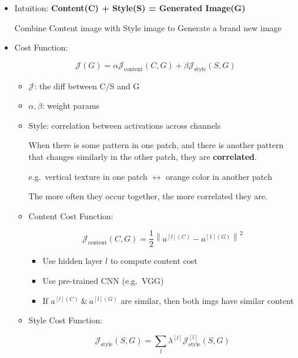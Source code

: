 \documentclass[
]{book}
\providecommand{\tightlist}{%
  \setlength{\itemsep}{0pt}\setlength{\parskip}{0pt}}
\begin{document}
\begin{itemize}
  \begin{itemize}
  \item
    Intuition: \textbf{Content(C) + Style(S) = Generated Image(G)}

    Combine Content image with Style image to Generate a brand new image
  \item
    Cost Function:

    \[\begin{equation}
      \mathcal{J}(G)=\alpha\mathcal{J}_ \text{content}(C,G)+\beta\mathcal{J}_ \text{style}(S,G)
      \end{equation}\]

    \begin{itemize}
    \item
      \(\mathcal{J}\): the diff between C/S and G
    \item
      \(\alpha,\beta\): weight params
    \item
      Style: correlation between activations across channels

      When there is some pattern in one patch, and there is another
      pattern that changes similarly in the other patch, they are
      \textbf{correlated}.

      e.g.~vertical texture in one patch \(\leftrightarrow\) orange
      color in another patch

      The more often they occur together, the more correlated they are.
    \item
      Content Cost Function:

      \[\begin{equation}
        \mathcal{J}_ \text{content}(C,G)=\frac{1}{2}\left\lVert{a^{[l](C)}-a^{[1](G)}}\right\lVert^2
        \end{equation}\]

      \begin{itemize}
      \tightlist
      \item
        Use hidden layer \(l\) to compute content cost
      \item
        Use pre-trained CNN (e.g.~VGG)
      \item
        If \(a^{[l](C)}\ \&\ a^{[l](G)}\) are similar, then both imgs
        have similar content\\
      \end{itemize}
    \item
      Style Cost Function:

      \[\begin{equation}
        \mathcal{J}_ \text{style}(S,G)=\sum_l{\lambda^{[l]}\mathcal{J}_ \text{style}^{[l]}(S,G)}
        \end{equation}\]


\end{itemize}
\end{itemize}
\end{itemize}
\end{document}
